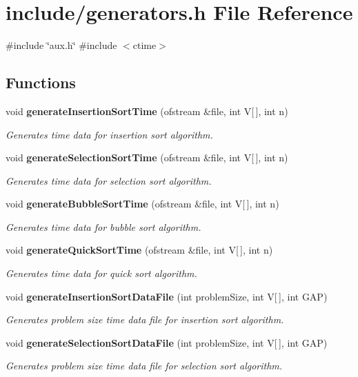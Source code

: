 \section{include/generators.h \-File \-Reference}
\label{generators_8h}
{\ttfamily \#include \char`\"{}aux.\-h\char`\"{}}\*
{\ttfamily \#include $<$ctime$>$}\*
\subsection*{\-Functions}
\begin{DoxyCompactItemize}
\item 
void {\bf generate\-Insertion\-Sort\-Time} (ofstream \&file, int \-V[$\,$], int n)
\begin{DoxyCompactList}\small\item\em \-Generates time data for insertion sort algorithm. \end{DoxyCompactList}\item 
void {\bf generate\-Selection\-Sort\-Time} (ofstream \&file, int \-V[$\,$], int n)
\begin{DoxyCompactList}\small\item\em \-Generates time data for selection sort algorithm. \end{DoxyCompactList}\item 
void {\bf generate\-Bubble\-Sort\-Time} (ofstream \&file, int \-V[$\,$], int n)
\begin{DoxyCompactList}\small\item\em \-Generates time data for bubble sort algorithm. \end{DoxyCompactList}\item 
void {\bf generate\-Quick\-Sort\-Time} (ofstream \&file, int \-V[$\,$], int n)
\begin{DoxyCompactList}\small\item\em \-Generates time data for quick sort algorithm. \end{DoxyCompactList}\item 
void {\bf generate\-Insertion\-Sort\-Data\-File} (int problem\-Size, int \-V[$\,$], int \-G\-A\-P)
\begin{DoxyCompactList}\small\item\em \-Generates problem size time data file for insertion sort algorithm. \end{DoxyCompactList}\item 
void {\bf generate\-Selection\-Sort\-Data\-File} (int problem\-Size, int \-V[$\,$], int \-G\-A\-P)
\begin{DoxyCompactList}\small\item\em \-Generates problem size time data file for selection sort algorithm. \end{DoxyCompactList}\item 

\end{DoxyCompactItemize}
